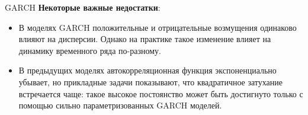 \begin{frame}{GARCH}
\textbf{Некоторые важные недостатки}:
\begin{itemize}
    \item В моделях GARCH положительные и отрицательные возмущения одинаково влияют на дисперсии. Однако на практике такое изменение влияет на динамику временного ряда по-разному.
    \item В предыдущих моделях автокорреляционная функция экспоненциально убывает, но прикладные задачи показывают, что квадратичное затухание встречается чаще: такое высокое постоянство может быть достигнуто только с помощью сильно параметризованных GARCH моделей.
\end{itemize}

\end{frame}


